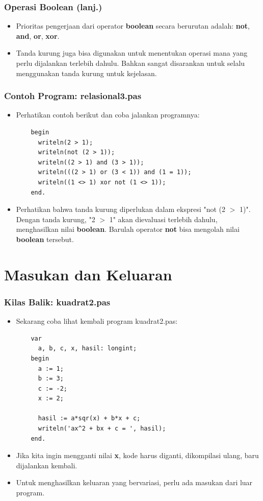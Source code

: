 \begin{frame}
\frametitle{Operasi Boolean (lanj.)}
\begin{itemize}
  \item Prioritas pengerjaan dari operator \textbf{boolean} secara berurutan adalah: \textbf{not}, \textbf{and}, \textbf{or}, \textbf{xor}.
  \item Tanda kurung juga bisa digunakan untuk menentukan operasi mana yang perlu dijalankan terlebih dahulu. Bahkan sangat disarankan untuk selalu menggunakan tanda kurung untuk kejelasan.
\end{itemize}
\end{frame}

\begin{frame}[fragile]
\frametitle{Contoh Program: relasional3.pas}
\begin{itemize}
  \item Perhatikan contoh berikut dan coba jalankan programnya:
  \begin{lstlisting}
    begin
      writeln(2 > 1);
      writeln(not (2 > 1));
      writeln((2 > 1) and (3 > 1));
      writeln(((2 > 1) or (3 < 1)) and (1 = 1));
      writeln((1 <> 1) xor not (1 <> 1));
    end.
  \end{lstlisting}
  \item Perhatikan bahwa tanda kurung diperlukan dalam ekspresi "not (2 $>$ 1)". Dengan tanda kurung, "2 $>$ 1" akan dievaluasi terlebih dahulu, menghasilkan nilai \textbf{boolean}. Barulah operator \textbf{not} bisa mengolah nilai \textbf{boolean} tersebut.
\end{itemize}
\end{frame}

\section{Masukan dan Keluaran}
\frame{\sectionpage}

\begin{frame}[fragile]
\frametitle{Kilas Balik: kuadrat2.pas}
\begin{itemize}
  \item Sekarang coba lihat kembali program kuadrat2.pas:
  \begin{lstlisting}
    var
      a, b, c, x, hasil: longint;
    begin
      a := 1;
      b := 3;
      c := -2;
      x := 2;

      hasil := a*sqr(x) + b*x + c;
      writeln('ax^2 + bx + c = ', hasil);
    end.
  \end{lstlisting}
  \item Jika kita ingin mengganti nilai \textbf{x}, kode harus diganti, dikompilasi ulang, baru dijalankan kembali.
  \item Untuk menghasilkan keluaran yang bervariasi, perlu ada \newline masukan dari luar program.
\end{itemize}
\end{frame}

